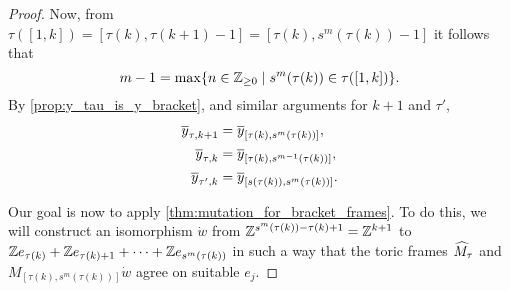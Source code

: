 \begin{proof}
	Now, from $\tau([1, k]) = [\tau(k), \tau(k+1) - 1] = [\tau(k), s^m(\tau(k)) - 1]$ it
	follows that
	\begin{equation*}
		m - 1 = \max\{n \in \mathbb{Z}_{\geq 0} \mid s^m(\tau(k)) \in \tau([1, k])\}.
	\end{equation*}
	By \cref{prop:y_tau_is_y_bracket}, and similar arguments for $k+1$ and $\tau'$,
	\begin{align*}
		\overline{y}_{\tau, k+1} & = \overline{y}_{[\tau(k), s^m(\tau(k))]},     \\
		\overline{y}_{\tau, k}   & = \overline{y}_{[\tau(k), s^{m-1}(\tau(k))]}, \\
		\overline{y}_{\tau', k}  & = \overline{y}_{[s(\tau(k)), s^m(\tau(k))]}.
	\end{align*}

	Our goal is now to apply \cref{thm:mutation_for_bracket_frames}. To do this, we will
	construct an isomorphism $\dot{w}$ from $\mathbb{Z}^{s^m(\tau(k)) -\tau(k) + 1} = \mathbb{Z}^{k+1}$
	to $\mathbb{Z} e_{\tau(k)} + \mathbb{Z} e_{\tau(k)+1} + \dotsb + \mathbb{Z} e_{s^m(\tau(k))}$ in such a
	way that the toric frames $\widehat{M}_\tau$ and $M_{[\tau(k), s^m(\tau(k))]}\dot{w}$ agree
	on suitable $e_j$.


\end{proof}
